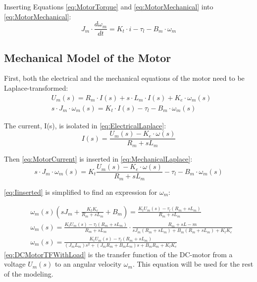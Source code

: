 Inserting Equations \eqref{eq:MotorTorque} and \eqref{eq:MotorMechanical} into \autoref{eq:MotorMechanical}:
\begin{equation}
	J_{m} \cdot \frac{d\omega_{m}}{dt} = K_{t} \cdot i - \tau_{l} - B_{m} \cdot \omega_{m}
\end{equation}

\subsection*{Mechanical Model of the Motor}
First, both the electrical and the mechanical equations of the motor need to be Laplace-transformed:
\begin{subequations}
	\begin{flalign}
		&U_{m}(s) = R_{m} \cdot I(s) + s \cdot L_{m} \cdot I(s) + K_{e} \cdot \omega_{m}(s) \label{eq:ElectricalLaplace}\\	
		&s\cdot J_{m} \cdot \omega_{m}(s) = K_{t} \cdot I(s) - \tau_{l} - B_{m} \cdot \omega_{m}(s)	\label{eq:MechanicalLaplace}
	\end{flalign}
\end{subequations}

The current, I(s), is isolated in \autoref{eq:ElectricalLaplace}:
\begin{equation}
	I(s)=\frac{U_m(s)-K_e\cdot\omega(s)}{R_m+sL_m}
	\label{eq:MotorCurrent}
\end{equation}

Then \autoref{eq:MotorCurrent} is inserted in \autoref{eq:MechanicalLaplace}:
\begin{equation}
	s\cdot J_{m} \cdot \omega_{m}(s) = K_{t} \frac{U_m(s)-K_e\cdot\omega(s)}{R_m+sL_m} - \tau_{l} - B_{m} \cdot \omega_{m}(s)
	\label{eq:Iinserted}	
\end{equation}

\autoref{eq:Iinserted} is simplified to find an expression for $\omega_m$: 

\begin{subequations}
	\begin{flalign}
		&\omega_m(s) \left(sJ_m + \frac{K_tK_e}{R_m + sL_m} + B_m \right) = \frac{K_tU_m(s) - \tau_l(R_m + sL_m)}{R_m + sL_m} \\	
		&\omega_m(s) = \frac{K_tU_m(s) - \tau_l(R_m + sL_m)}{R_m + sL_m} \cdot \frac{R_m + sL-m}{sJ_m(R_m + sL_m) + B_m(R_m + sL_m) + K_tK_e} \\
		&\omega_m(s) = \frac{K_tU_m(s) - \tau_l(R_m + sL_m)}{(J_mL_m)s^2 + (J_mR_m + B_mL_m)s + B_mR_m + K_tK_e} \label{eq:DCMotorTFWithLoad}
	\end{flalign}
\end{subequations}
\autoref{eq:DCMotorTFWithLoad} is the transfer function of the DC-motor from a voltage $U_m(s)$ to an angular velocity $\omega_m$. This equation will be used for the rest of the modeling. 

